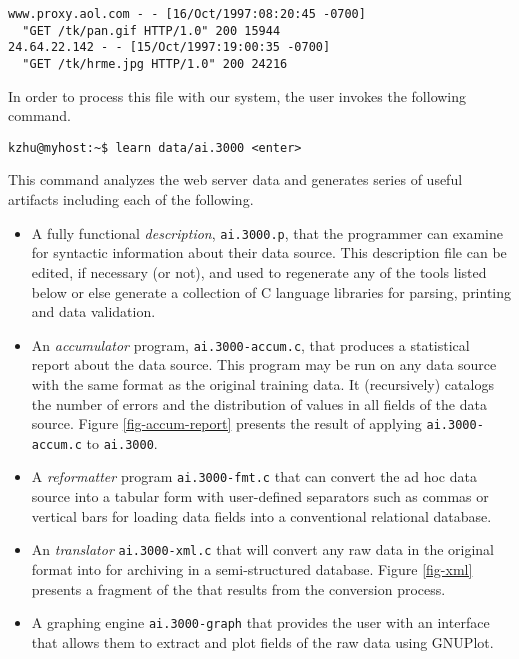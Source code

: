 \documentclass{sig-alternate-sigmod08}
\begin{document}
{\small
\begin{verbatim}
www.proxy.aol.com - - [16/Oct/1997:08:20:45 -0700] 
  "GET /tk/pan.gif HTTP/1.0" 200 15944
24.64.22.142 - - [15/Oct/1997:19:00:35 -0700] 
  "GET /tk/hrme.jpg HTTP/1.0" 200 24216
\end{verbatim}
}

In order to process this file with our system, the user invokes the 
following command.

{\small
\begin{verbatim}
kzhu@myhost:~$ learn data/ai.3000 <enter>
\end{verbatim}
}

This command analyzes the web server data and generates series
of useful artifacts including each of the following.

\begin{itemize}
\item A fully functional {\em \pads{} description}, {\tt ai.3000.p}, that 
the programmer can
examine for syntactic information about their data source.  This description 
file can be edited, if necessary (or not), and used to regenerate any of the 
tools listed below or else generate a collection of C language libraries for 
parsing, printing and data validation.
\item An {\em accumulator} program, {\tt ai.3000-accum.c},
that produces a statistical report about the data source.  This
program may be run on any data source with the same format
as the original training data.  It (recursively) catalogs the number of errors
and the distribution of values in all fields of the data source.
Figure \ref{fig-accum-report} presents the result of applying 
{\tt ai.3000-accum.c} to {\tt ai.3000}.
\item A {\em reformatter} program {\tt ai.3000-fmt.c} that can convert 
the ad hoc data source into a tabular form with user-defined separators
such as commas or vertical bars for loading data fields into a conventional
relational database.
\item An {\em \xml{} translator} {\tt ai.3000-xml.c} that will convert
any raw data in the original format into \xml{} for archiving in a 
semi-structured database.  Figure \ref{fig-xml} presents a fragment of
the \xml{} that results from the conversion process.
\item A graphing engine {\tt ai.3000-graph} that provides the user with
an interface that allows them to extract and plot fields of the raw data 
using GNUPlot.
\end{itemize}
\end{document}
